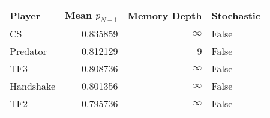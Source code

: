 \begin{tabular}{lrrl}
\toprule
    Player &  Mean $p_{N-1}$ &  Memory Depth & Stochastic \\
\midrule
        CS &        0.835859 &            \(\infty\) &      False \\
  Predator &        0.812129 &             9 &      False \\
       TF3 &        0.808736 &            \(\infty\) &      False \\
 Handshake &        0.801356 &            \(\infty\) &      False \\
       TF2 &        0.795736 &            \(\infty\) &      False \\
\bottomrule
\end{tabular}
